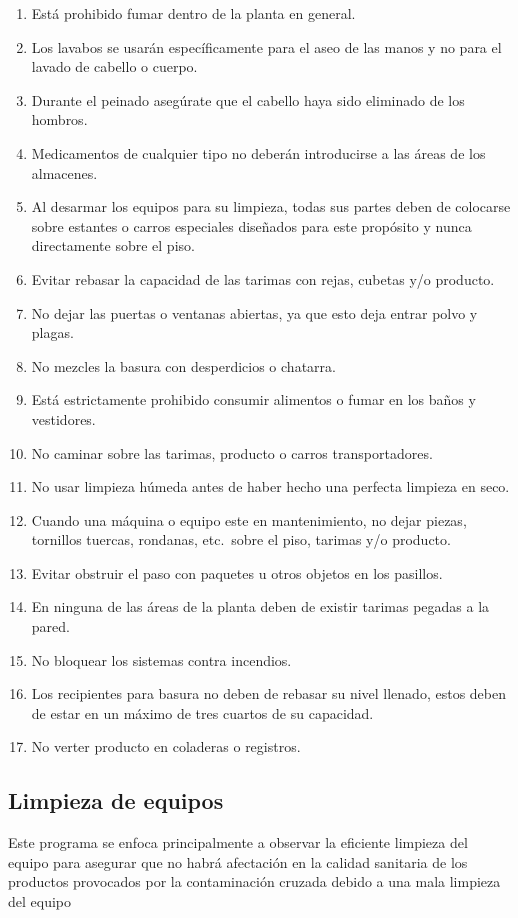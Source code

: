 \begin{enumerate}
	\item Está prohibido fumar dentro de la planta en general.
	\item Los lavabos se usarán específicamente para el aseo de las manos y no para el lavado de cabello o cuerpo.
	\item Durante el peinado asegúrate que el cabello haya sido eliminado de los hombros.
	\item Medicamentos de cualquier tipo no deberán introducirse a las áreas de los almacenes.
	\item Al desarmar los equipos para su limpieza, todas sus partes deben de colocarse sobre estantes o carros especiales diseñados para este propósito y nunca directamente sobre el piso.
	\item Evitar rebasar la capacidad de las tarimas con rejas, cubetas y/o producto.
	\item No dejar las puertas o ventanas abiertas, ya que esto deja entrar polvo y plagas.
	\item No mezcles la basura con desperdicios o chatarra.
	\item Está estrictamente prohibido consumir alimentos o fumar en los baños y vestidores.
	\item No caminar sobre las tarimas, producto o carros transportadores.
	\item No usar limpieza húmeda antes de haber hecho una perfecta limpieza en seco.
	\item Cuando una máquina o equipo este en mantenimiento, no dejar piezas, tornillos tuercas, rondanas, etc.\ sobre el piso, tarimas y/o producto.
	\item Evitar obstruir el paso con paquetes u otros objetos en los pasillos.
	\item En ninguna de las áreas de la planta deben de existir tarimas pegadas a la pared.
	\item No bloquear los sistemas contra incendios.
	\item Los recipientes para basura no deben de rebasar su nivel llenado, estos deben de estar en un máximo de tres cuartos de su capacidad.
	\item No verter producto en coladeras o registros.
\end{enumerate}

\subsection{Limpieza de equipos}

Este programa se enfoca principalmente a observar la eficiente limpieza del equipo para asegurar que no habrá afectación en la calidad sanitaria de los productos provocados por la contaminación cruzada debido a una mala limpieza del equipo

